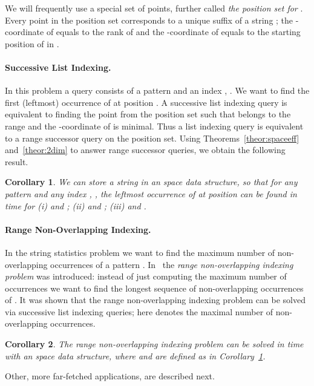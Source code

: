 \documentclass[11pt]{article}
\newtheorem{corollary}{Corollary}
\begin{document}
We will frequently use a special set of points, further called 
\emph{the position set for }.
Every point  in the position set corresponds to a unique suffix 
of a string ; 
the -coordinate of  equals to the rank of  and the -coordinate 
of  equals to the starting position of  in . 

  
\paragraph{Successive List Indexing.}
In this problem a query consists of a pattern  
and an index , . We want to find the first (leftmost) 
occurrence of   at position . 
A successive list indexing query  is equivalent to finding the 
point  from the position set such that  belongs to the range   and the -coordinate of  is minimal. 
Thus a list indexing query is equivalent to a range successor query on 
the position set. Using Theorems~\ref{theor:spaceeff} and~\ref{theor:2dim} 
to answer range successor queries, we obtain the following result.
\begin{corollary}\label{cor:succind}
We can store a string  in an  space data structure, so that 
for any pattern  and any index , , the leftmost 
occurrence of  at position  can be found in  time 
for 
 (i)  and ;
(ii)  and ;
(iii)  and .
\end{corollary}

\paragraph{Range Non-Overlapping Indexing.}
In the string statistics problem we want to find the maximum number of non-overlapping occurrences of a pattern . In~\cite{KKL07wads} the 
\emph{range non-overlapping indexing problem} was introduced: 
instead of just computing the maximum number of occurrences 
we want to find the longest sequence of non-overlapping occurrences of .
It was shown \cite{KKL07wads} that the range non-overlapping 
indexing problem can be solved via  successive list indexing 
queries; here  denotes the maximal number of non-overlapping occurrences. 

\begin{corollary}\label{cor:rangenon}
The range non-overlapping indexing problem can be solved  in  time with an  space data structure, where  and  
are defined as in Corollary~\ref{cor:succind}.
\end{corollary}

Other, more far-fetched applications, are described next.
\end{document}
